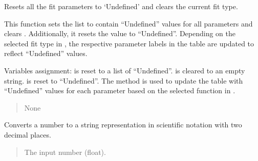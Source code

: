 \documentclass[letterpaper,10pt,english]{sphinxmanual}
\begin{document}
\begin{fulllineitems}
\begin{fulllineitems}
\begin{quote}
\begin{description}
\end{description}\end{quote}

\end{fulllineitems}


\begin{fulllineitems}
\label{\detokenize{FLIMGraphics:FLIMGraphics.FLIMGraphic.resetParametersLabels}}
\pysigstartsignatures
{}
\pysigstopsignatures
\sphinxAtStartPar
Resets all the fit parameters to ‘Undefined’ and clears the current fit type.

\sphinxAtStartPar
This function sets the list  to contain “Undefined” values for all parameters and clears .
Additionally, it resets the  value to “Undefined”. Depending on the selected fit type in ,
the respective parameter labels in the table are updated to reflect “Undefined” values.

\sphinxAtStartPar
Variables assignment:
\sphinxhyphen{}  is reset to a list of “Undefined”.
\sphinxhyphen{}  is cleared to an empty string.
\sphinxhyphen{}  is reset to “Undefined”.
\sphinxhyphen{} The  method is used to update the table with “Undefined” values for each parameter
based on the selected function in .
\begin{quote}\begin{description}
\sphinxAtStartPar
None

\end{description}\end{quote}

\end{fulllineitems}


\begin{fulllineitems}
\label{\detokenize{FLIMGraphics:FLIMGraphics.FLIMGraphic.roundStringPCov}}
\pysigstartsignatures
{}
\pysigstopsignatures
\sphinxAtStartPar
Converts a number to a string representation in scientific notation with two decimal places.
\begin{quote}\begin{description}
\sphinxAtStartPar
{} \textendash{} The input number (float).


\end{description}
\end{quote}
\end{fulllineitems}
\end{fulllineitems}
\end{document}
